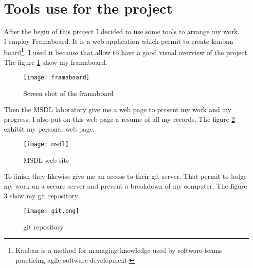 \section{Tools use for the project}

After the begin of this project I decided to use some tools to arrange my work.
~\\

I employ Framaboard. It is a web application which permit to create kanban board\footnote{Kanban is a method for managing knowledge used by software teams practicing agile software development.\cite{wiki_kanban}}. I used it because that allow to have a good visual overview of the project. The figure \ref{fig:framaboard} show my framaboard.

\begin{figure}[h]
  \centering
  \texttt{[image: framaboard]}
  \caption{Screen shot of the framaboard}
  \label{fig:framaboard}
\end{figure}

Then the MSDL laboratory give me a web page to present my work and my progress. I also put on this web page a resume of all my records. The figure \ref{fig:msdl} exhibit my personal web page.

\begin{figure}[h]
  \centering
  \texttt{[image: msdl]}
  \caption{MSDL web site}
  \label{fig:msdl}
\end{figure}


To finish they likewise give me an access to their git server. That permit to lodge my work on a secure server and prevent a breakdown of my computer. The figure \ref{fig:git} show my git repository.

\begin{figure}[h]
  \centering
  \texttt{[image: git.png]}
  \caption{git repository}
  \label{fig:git}
\end{figure}



